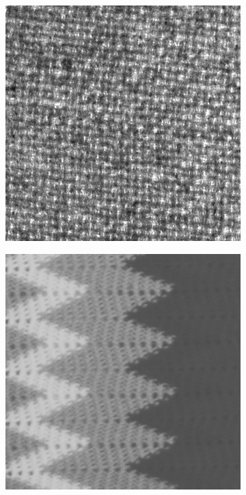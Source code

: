 \begin{figure}[H]
\begin{subfigure}{.15\textwidth}
  \centering
  \includegraphics[width=.8\linewidth]{kylberg_examples/blanket1_003.png}
\end{subfigure}%
\begin{subfigure}{.15\textwidth}
  \centering
  \includegraphics[width=.8\linewidth]{kylberg_examples/blanket2_003.png}
\end{subfigure}
\begin{subfigure}{.15\textwidth}
  \centering

\end{subfigure}
\end{figure}
